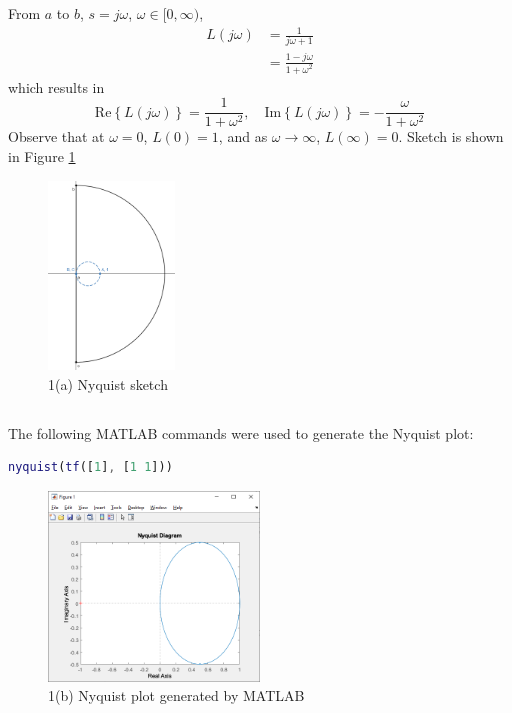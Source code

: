 From $a$ to $b$, $s = j \omega$, $\omega \in [0, \infty)$, 
\begin{align*}
    L(j \omega) &= \frac{1}{j \omega + 1} \\
    &= \frac{1 - j \omega}{1 + \omega^2} 
\end{align*}
which results in 
\begin{equation*}
    \text{Re} \left\{ L(j \omega) \right\} = \frac{1}{1 + \omega^2}, \quad \text{Im} \left\{ L(j \omega) \right\} = -\frac{\omega}{1 + \omega^2}
\end{equation*}
Observe that at $\omega = 0$, $L(0) = 1$, and as $\omega \to \infty$, $L(\infty) = 0$. Sketch is shown in Figure \ref{fig:Q1Sketch}
\begin{figure}[h]
    \centering
    \includegraphics[width=0.3\textwidth]{Questions/Figures/Q1Sketch.png}
    \caption{1(a) Nyquist sketch}
    \label{fig:Q1Sketch}
\end{figure}

\subsection{}
The following MATLAB commands were used to generate the Nyquist plot:
\begin{lstlisting}[language=Matlab]
nyquist(tf([1], [1 1]))
\end{lstlisting}
\begin{figure}[h]
    \centering
    \includegraphics[width=0.5\textwidth]{Questions/Figures/Q1Matlab.png}
    \caption{1(b) Nyquist plot generated by MATLAB}
\end{figure}

